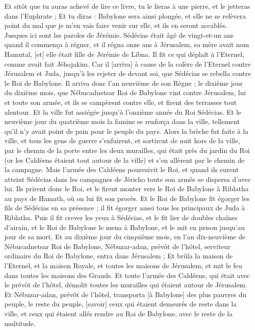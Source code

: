 \begin{multicols}{2}
Et sitôt que tu auras achevé de lire ce livre, tu le lieras à une pierre, et le jetteras dans l'Euphrate ;
Et tu diras : Babylone sera ainsi plongée, et elle ne se relèvera point du mal que je m'en vais faire venir sur elle, et ils en seront accablés. Jusques ici sont les paroles de Jérémie.
\VerseOne{}Sédécias était âgé de vingt-et-un ans quand il commença à régner, et il régna onze ans à Jérusalem, sa mère avait nom Hamutal, [et] elle était fille de Jérémie de Libna.
Il fit ce qui déplaît à l'Eternel, comme avait fait Jéhojakim.
Car il [arriva] à cause de la colère de l'Eternel contre Jérusalem et Juda, jusqu'à les rejeter de devant soi, que Sédécias se rebella contre le Roi de Babylone.
Il arriva donc l'an neuvième de son Règne ; le dixième jour du dixième mois, que Nébucadnetsar Roi de Babylone vint contre Jérusalem, lui et toute son armée, et ils se campèrent contre elle, et firent des terrasses tout alentour.
Et la ville fut assiégée jusqu’à l'onzième année du Roi Sédécias.
Et le neuvième jour du quatrième mois la famine se renforça dans la ville, tellement qu'il n'y avait point de pain pour le peuple du pays.
Alors la brèche fut faite à la ville, et tous les gens de guerre s'enfuirent, et sortirent de nuit hors de la ville, par le chemin de la porte entre les deux murailles, qui était près du jardin du Roi (or les Caldéens étaient tout autour de la ville) et s'en allèrent par le chemin de la campagne.
Mais l'armée des Caldéens poursuivit le Roi, et quand ils eurent atteint Sédécias dans les campagnes de Jéricho toute son armée se dispersa d'avec lui.
Ils prirent donc le Roi, et le firent monter vers le Roi de Babylone à Riblatha au pays de Hamath, où on lui fit son procès.
Et le Roi de Babylone fit égorger les fils de Sédécias en sa présence ; il fit égorger aussi tous les principaux de Juda à Riblatha.
Puis il fit crever les yeux à Sédécias, et le fit lier de doubles chaînes d'airain, et le Roi de Babylone le mena à Babylone, et le mit en prison jusqu'au jour de sa mort.
Et au dixième jour du cinquième mois, en l'an dix-neuvième de Nébucadnetsar Roi de Babylone, Nébuzar-adan, prévôt de l'hôtel, serviteur ordinaire du Roi de Babylone, entra dans Jérusalem ;
Et brûla la maison de l'Eternel, et la maison Royale, et toutes les maisons de Jérusalem, et mit le feu dans toutes les maisons des Grands.
Et toute l'armée des Caldéens, qui était avec le prévôt de l'hôtel, démolit toutes les murailles qui étaient autour de Jérusalem.
Et Nébuzar-adan, prévôt de l'hôtel, transporta [à Babylone] des plus pauvres du peuple, le reste du peuple, [savoir] ceux qui étaient demeurés de reste dans la ville, et ceux qui étaient allés rendre au Roi de Babylone, avec le reste de la multitude.

\end{multicols}
